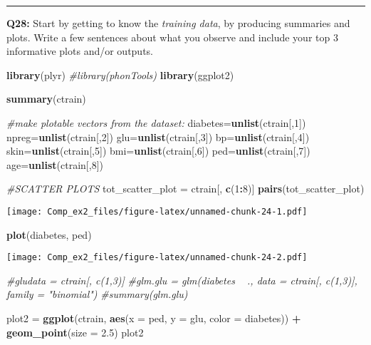 \documentclass[]{article}
\newenvironment{Shaded}{\begin{snugshade}}{\end{snugshade}}
\newcommand{\KeywordTok}[1]{\textcolor[rgb]{0.13,0.29,0.53}{\textbf{#1}}}
\newcommand{\DataTypeTok}[1]{\textcolor[rgb]{0.13,0.29,0.53}{#1}}
\newcommand{\DecValTok}[1]{\textcolor[rgb]{0.00,0.00,0.81}{#1}}
\newcommand{\FloatTok}[1]{\textcolor[rgb]{0.00,0.00,0.81}{#1}}
\newcommand{\StringTok}[1]{\textcolor[rgb]{0.31,0.60,0.02}{#1}}
\newcommand{\CommentTok}[1]{\textcolor[rgb]{0.56,0.35,0.01}{\textit{#1}}}
\newcommand{\OperatorTok}[1]{\textcolor[rgb]{0.81,0.36,0.00}{\textbf{#1}}}
\newcommand{\NormalTok}[1]{#1}
\begin{document}
\begin{center}\rule{0.5\linewidth}{\linethickness}\end{center}

\textbf{Q28:} Start by getting to know the \emph{training data}, by
producing summaries and plots. Write a few sentences about what you
observe and include your top 3 informative plots and/or outputs.

\begin{Shaded}
\begin{Highlighting}[]
\KeywordTok{library}\NormalTok{(plyr)}
\CommentTok{#library(phonTools)}
\KeywordTok{library}\NormalTok{(ggplot2)}

\KeywordTok{summary}\NormalTok{(ctrain)}

\CommentTok{#make plotable vectors from the dataset: }
\NormalTok{diabetes=}\KeywordTok{unlist}\NormalTok{(ctrain[,}\DecValTok{1}\NormalTok{])}
\NormalTok{npreg=}\KeywordTok{unlist}\NormalTok{(ctrain[,}\DecValTok{2}\NormalTok{])}
\NormalTok{glu=}\KeywordTok{unlist}\NormalTok{(ctrain[,}\DecValTok{3}\NormalTok{])}
\NormalTok{bp=}\KeywordTok{unlist}\NormalTok{(ctrain[,}\DecValTok{4}\NormalTok{])}
\NormalTok{skin=}\KeywordTok{unlist}\NormalTok{(ctrain[,}\DecValTok{5}\NormalTok{])}
\NormalTok{bmi=}\KeywordTok{unlist}\NormalTok{(ctrain[,}\DecValTok{6}\NormalTok{])}
\NormalTok{ped=}\KeywordTok{unlist}\NormalTok{(ctrain[,}\DecValTok{7}\NormalTok{])}
\NormalTok{age=}\KeywordTok{unlist}\NormalTok{(ctrain[,}\DecValTok{8}\NormalTok{])}

\CommentTok{#SCATTER PLOTS }
\NormalTok{tot_scatter_plot =}\StringTok{ }\NormalTok{ctrain[, }\KeywordTok{c}\NormalTok{(}\DecValTok{1}\OperatorTok{:}\DecValTok{8}\NormalTok{)]}
\KeywordTok{pairs}\NormalTok{(tot_scatter_plot)}
\end{Highlighting}
\end{Shaded}

\texttt{[image: Comp\_ex2\_files/figure-latex/unnamed-chunk-24-1.pdf]}

\begin{Shaded}
\begin{Highlighting}[]
\KeywordTok{plot}\NormalTok{(diabetes, ped)}
\end{Highlighting}
\end{Shaded}

\texttt{[image: Comp\_ex2\_files/figure-latex/unnamed-chunk-24-2.pdf]}

\begin{Shaded}
\begin{Highlighting}[]
\CommentTok{#gludata = ctrain[, c(1,3)]}
\CommentTok{#glm.glu = glm(diabetes ~ ., data = ctrain[, c(1,3)], family = "binomial")}
\CommentTok{#summary(glm.glu)}

\NormalTok{plot2 =}\StringTok{ }\KeywordTok{ggplot}\NormalTok{(ctrain, }\KeywordTok{aes}\NormalTok{(}\DataTypeTok{x =}\NormalTok{ ped, }\DataTypeTok{y =}\NormalTok{ glu, }\DataTypeTok{color =}\NormalTok{ diabetes)) }\OperatorTok{+}\StringTok{ }
\StringTok{    }\KeywordTok{geom_point}\NormalTok{(}\DataTypeTok{size =} \FloatTok{2.5}\NormalTok{)}
\NormalTok{plot2}
\end{Highlighting}
\end{Shaded}
\end{document}

